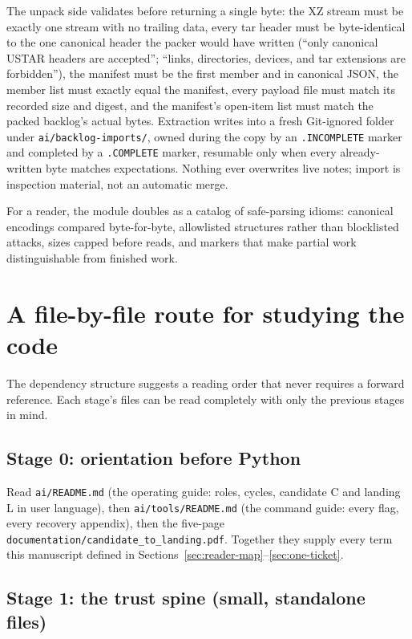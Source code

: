 \documentclass[10pt,aps,prd,twocolumn,nofootinbib]{revtex4-2}
\newcommand{\file}[1]{\texttt{#1}}
\begin{document}
The unpack side validates before returning a single byte: the XZ
stream must be exactly one stream with no trailing data, every tar
header must be byte-identical to the one canonical header the packer
would have written (``only canonical USTAR headers are accepted'';
``links, directories, devices, and tar extensions are forbidden''),
the manifest must be the first member and in canonical JSON, the
member list must exactly equal the manifest, every payload file must
match its recorded size and digest, and the manifest's open-item list
must match the packed backlog's actual bytes.  Extraction writes into
a fresh Git-ignored folder under \file{ai/backlog-imports/}, owned
during the copy by an \file{.INCOMPLETE} marker and completed by a
\file{.COMPLETE} marker, resumable only when every already-written
byte matches expectations.  Nothing ever overwrites live notes; import
is inspection material, not an automatic merge.

For a reader, the module doubles as a catalog of safe-parsing idioms:
canonical encodings compared byte-for-byte, allowlisted structures
rather than blocklisted attacks, sizes capped before reads, and
markers that make partial work distinguishable from finished work.

\section{A file-by-file route for studying the code}
\label{sec:route}

The dependency structure suggests a reading order that never requires
a forward reference.  Each stage's files can be read completely with
only the previous stages in mind.

\subsection{Stage 0: orientation before Python}

Read \file{ai/README.md} (the operating guide: roles, cycles,
candidate C and landing L in user language), then
\file{ai/tools/README.md} (the command guide: every flag, every
recovery appendix), then the five-page
\file{documentation/candidate\_to\_landing.pdf}.  Together they supply
every term this manuscript defined in
Sections~\ref{sec:reader-map}--\ref{sec:one-ticket}.

\subsection{Stage 1: the trust spine (small, standalone files)}
\end{document}
